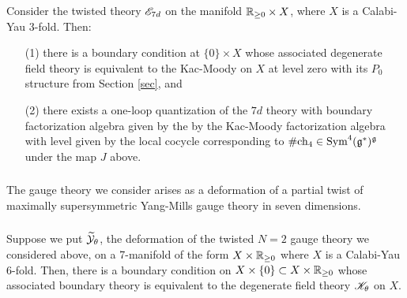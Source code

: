 \begin{thm} Consider the twisted theory $\mathscr E_{7d}$ on the manifold $\mathbb R_{\geq 0} \times X$, where $X$ is a Calabi-Yau $3$-fold. 
Then:
\begin{itemize}
\item[(1)] there is a boundary condition at $\{0\} \times X$ whose associated degenerate field theory is equivalent to the Kac-Moody on $X$ at level zero with its $P_0$ structure from Section \ref{sec}, and
\item[(2)] there exists a one-loop quantization of the $7d$ theory with boundary factorization algebra given by the by the Kac-Moody factorization algebra with level given by the local cocycle corresponding to $\# {\rm ch}_4 \in {\rm Sym}^4(\mathfrak g^*)^\mathfrak g$ under the map $J$ above. 
\end{itemize}
\end{thm}

\subsubsection{}

The gauge theory we consider arises as a deformation of a partial twist of maximally supersymmetric Yang-Mills gauge theory in seven dimensions. 

\subsubsection{}

\begin{thm} Suppose we put $\widetilde{\mathcal Y}_\theta$, the deformation of the twisted $N=2$ gauge theory we considered above, on a 7-manifold of the form $X \times \mathbb R_{\geq 0}$ where $X$ is a Calabi-Yau 6-fold.  Then, there is a boundary condition on $X \times \{0\} \subset X \times \mathbb R_{\geq 0}$ whose associated boundary theory is equivalent to the degenerate field theory $\mathscr K_\theta$ on $X$. 
\end{thm}
